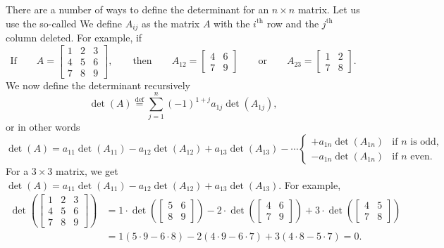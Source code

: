 There are a number of ways to define the determinant for an $n \times n$
matrix.  Let us use the so-called \emph{}
We define $A_{ij}$ as
the matrix $A$ with the $i^{\text{th}}$ row and the $j^{\text{th}}$ column
deleted.  For example, if
\begin{equation*}
\text{If} \qquad
A = 
\begin{bmatrix}
1 & 2 & 3 \\
4 & 5 & 6 \\
7 & 8 & 9
\end{bmatrix} ,
\qquad
\text{then}
\qquad
A_{12} = 
\begin{bmatrix}
4 & 6 \\
7 & 9
\end{bmatrix}
\qquad
\text{or}
\qquad
A_{23} = 
\begin{bmatrix}
1 & 2 \\
7 & 8
\end{bmatrix} .
\end{equation*}
We now define the determinant recursively
\begin{equation*}
\det (A)
\overset{\text{def}}{=}
\sum_{j=1}^n
{(-1)}^{1+j}
a_{1j} \det (A_{1j}) ,
\end{equation*}
or in other words
\begin{equation*}
\det (A) =
a_{11} \det (A_{11}) - 
a_{12} \det (A_{12}) + 
a_{13} \det (A_{13}) - 
\cdots
\begin{cases}
+ a_{1n} \det (A_{1n}) & \text{if } n \text{ is odd,} \\
- a_{1n} \det (A_{1n}) & \text{if } n \text{ even.}
\end{cases}
\end{equation*}
For a $3 \times 3$ matrix,
we get $\det (A) = a_{11} \det (A_{11}) -
a_{12} \det (A_{12}) + a_{13} \det (A_{13})$.  For example,
\begin{equation*}
\begin{split}
\det \left(
\begin{bmatrix}
1 & 2 & 3 \\
4 & 5 & 6 \\
7 & 8 & 9
\end{bmatrix}
\right)
& =
1 \cdot
\det \left(
\begin{bmatrix}
5 & 6 \\
8 & 9
\end{bmatrix}
\right)
-
2 \cdot
\det \left(
\begin{bmatrix}
4 & 6 \\
7 & 9
\end{bmatrix}
\right)
+
3 \cdot
\det \left(
\begin{bmatrix}
4 & 5 \\
7 & 8
\end{bmatrix}
\right) \\
& =
1 (5 \cdot 9 - 6 \cdot 8)
-
2 (4 \cdot 9 - 6 \cdot 7)
+
3 (4 \cdot 8 - 5 \cdot 7)
= 0 .
\end{split}
\end{equation*}

